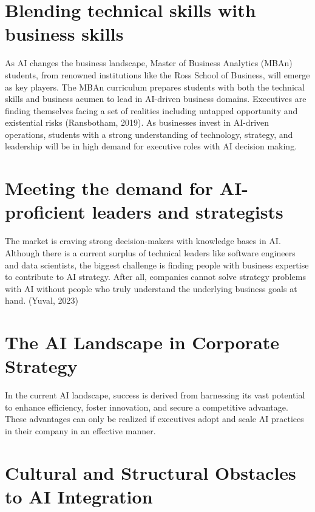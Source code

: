 \documentclass[
]{book}
\begin{document}
\hypertarget{blending-technical-skills-with-business-skills}{%
\section{Blending technical skills with business skills}\label{blending-technical-skills-with-business-skills}}

As AI changes the business landscape, Master of Business Analytics (MBAn) students, from renowned institutions like the Ross School of Business, will emerge as key players. The MBAn curriculum prepares students with both the technical skills and business acumen to lead in AI-driven business domains. Executives are finding themselves facing a set of realities including untapped opportunity and existential risks (Ransbotham, 2019). As businesses invest in AI-driven operations, students with a strong understanding of technology, strategy, and leadership will be in high demand for executive roles with AI decision making.

\hypertarget{meeting-the-demand-for-ai-proficient-leaders-and-strategists}{%
\section{Meeting the demand for AI-proficient leaders and strategists}\label{meeting-the-demand-for-ai-proficient-leaders-and-strategists}}

The market is craving strong decision-makers with knowledge bases in AI. Although there is a current surplus of technical leaders like software engineers and data scientists, the biggest challenge is finding people with business expertise to contribute to AI strategy. After all, companies cannot solve strategy problems with AI without people who truly understand the underlying business goals at hand. (Yuval, 2023)

\hypertarget{the-ai-landscape-in-corporate-strategy}{%
\section{The AI Landscape in Corporate Strategy}\label{the-ai-landscape-in-corporate-strategy}}

In the current AI landscape, success is derived from harnessing its vast potential to enhance efficiency, foster innovation, and secure a competitive advantage. These advantages can only be realized if executives adopt and scale AI practices in their company in an effective manner.

\hypertarget{cultural-and-structural-obstacles-to-ai-integration}{%
\section{Cultural and Structural Obstacles to AI Integration}\label{cultural-and-structural-obstacles-to-ai-integration}}
\end{document}

